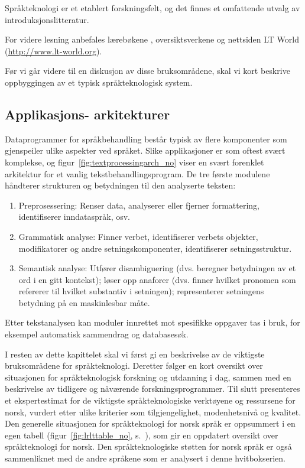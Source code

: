 \begin{multicols}{2}
Språkteknologi er et etablert forskningsfelt, og det finnes et omfattende utvalg av introduksjonslitteratur.

For videre lesning anbefales lærebøkene \cite{jurafsky-martin01, manning-schuetze1}, oversiktsverkene \cite{lt-survey1} og nettsiden LT World (\url{http://www.lt-world.org}).

Før vi går videre til en diskusjon av disse bruksområdene, skal vi kort beskrive oppbyggingen av et typisk språkteknologisk system.

\subsection[Applikasjonsarkitekturer]{Applikasjons- arkitekturer}

Dataprogrammer for språkbehandling består typisk av flere komponenter som gjenspeiler ulike aspekter ved språket. Slike applikasjoner er som oftest svært komplekse, og figur~\ref{fig:textprocessingarch_no} viser en svært forenklet arkitektur for et vanlig tekstbehandlingsprogram. De tre første modulene håndterer strukturen og betydningen til den analyserte teksten:

\begin{enumerate}
\item Preprosessering: Renser data, analyserer eller fjerner formattering, identifiserer  inndataspråk, osv.
\item Grammatisk analyse: Finner verbet, identifiserer verbets objekter, modifikatorer og andre setningskomponenter, identifiserer setningsstruktur.
\item Semantisk analyse: Utfører disambiguering (dvs. beregner betydningen av et ord i en gitt kontekst); løser opp anaforer (dvs. finner hvilket pronomen som refererer til hvilket substantiv i setningen); representerer setningens betydning på en maskinlesbar måte.
\end{enumerate}

Etter tekstanalysen kan moduler innrettet mot spesifikke oppgaver tas i bruk, for eksempel automatisk sammendrag og databasesøk. 

I resten av dette kapittelet skal vi først gi en beskrivelse av de viktigste bruksområdene for språkteknologi. Deretter følger en kort oversikt over situasjonen for språkteknologisk forskning og utdanning i dag, sammen med en beskrivelse av tidligere og nåværende forskningsprogrammer. Til slutt presenteres et ekspertestimat for de viktigste språkteknologiske verktøyene og ressursene for norsk, vurdert etter ulike kriterier som tilgjengelighet, modenhetsnivå og kvalitet. Den generelle situasjonen for språkteknologi for norsk språk er oppsummert i en egen tabell (figur~\ref{fig:lrlttable_no}, s.~\pageref{fig:lrlttable_no}), som gir en oppdatert oversikt over språkteknologi for norsk. Den språkteknologiske støtten for norsk språk er også sammenliknet med de andre språkene som er analysert i denne hvitbokserien.


\end{multicols}
